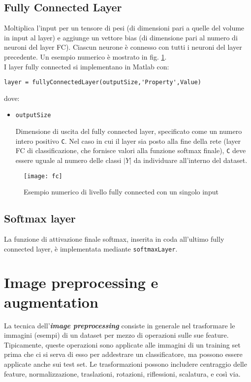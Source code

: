 \subsection{Fully Connected Layer}
\label{FC}
Moltiplica l'input per un tensore di pesi (di dimensioni pari a quelle del volume in input al layer) e aggiunge un vettore bias (di dimensione pari al numero di neuroni del layer FC). Ciascun neurone è connesso con tutti i neuroni del layer precedente. Un esempio numerico è mostrato in fig. \ref{fig:fc}.\\

I layer fully connected si implementano in Matlab con:
\begin{verbatim}
layer = fullyConnectedLayer(outputSize,'Property',Value)
\end{verbatim}

dove:

\begin{itemize}
	\item \verb|outputSize|
	
	Dimensione di uscita del fully connected layer, specificato come un numero intero positivo \verb|C|. Nel caso in cui il layer sia posto alla fine della rete (layer FC di classificazione, che fornisce valori alla funzione softmax finale), \verb|C| deve essere uguale al numero delle classi $|Y|$ da individuare all'interno del dataset.
\end{itemize}

\begin{figure}[h]
	\centering
	\texttt{[image: fc]}
	\caption{Esempio numerico di livello fully connected con un singolo input}
	\label{fig:fc}
\end{figure}

\subsection{Softmax layer}
\label{SOFTMAX}
La funzione di attivazione finale softmax, inserita in coda all'ultimo fully connected layer, è implementata mediante \verb|softmaxLayer|.



\section{Image preprocessing e augmentation}
\label{augmentation}

La tecnica dell'\textbf{\textit{image preprocessing}} consiste in generale nel trasformare le immagini (esempi) di un dataset per mezzo di operazioni sulle sue feature. Tipicamente, queste operazioni sono applicate alle immagini di un training set prima che ci si serva di esso per addestrare un classificatore, ma possono essere applicate anche sui test set.
Le trasformazioni possono includere centraggio delle feature, normalizzazione, traslazioni, rotazioni, riflessioni, scalatura, e così via.

